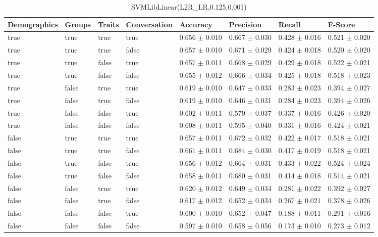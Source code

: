 \clearpage
\begin{table}[h]
	\centering
	\begin{tabular}{|l|l|l|l|l|l|l|l|} %
	\hline
	Demographics & Groups & Traits & Conversation & Accuracy & Precision & Recall & F-Score \\ \hline
	true & true & true & true & 0.656	\( \pm \) 0.010	& 0.667	\( \pm \) 0.030	& 0.428	\( \pm \) 0.016	& 0.521	\( \pm \) 0.020	\\ \hline
	true & true & true & false & 0.657	\( \pm \) 0.010	& 0.671	\( \pm \) 0.029	& 0.424	\( \pm \) 0.018	& 0.520	\( \pm \) 0.020	\\ \hline
	true & true & false & true & 0.657	\( \pm \) 0.011	& 0.668	\( \pm \) 0.029	& 0.429	\( \pm \) 0.018	& 0.522	\( \pm \) 0.021	\\ \hline
	true & true & false & false & 0.655	\( \pm \) 0.012	& 0.666	\( \pm \) 0.034	& 0.425	\( \pm \) 0.018	& 0.518	\( \pm \) 0.023	\\ \hline
	true & false & true & true & 0.619	\( \pm \) 0.010	& 0.647	\( \pm \) 0.033	& 0.283	\( \pm \) 0.023	& 0.394	\( \pm \) 0.027	\\ \hline
	true & false & true & false & 0.619	\( \pm \) 0.010	& 0.646	\( \pm \) 0.031	& 0.284	\( \pm \) 0.023	& 0.394	\( \pm \) 0.026	\\ \hline
	true & false & false & true & 0.602	\( \pm \) 0.011	& 0.579	\( \pm \) 0.037	& 0.337	\( \pm \) 0.016	& 0.426	\( \pm \) 0.020	\\ \hline
	true & false & false & false & 0.608	\( \pm \) 0.011	& 0.595	\( \pm \) 0.040	& 0.331	\( \pm \) 0.016	& 0.424	\( \pm \) 0.021	\\ \hline
	false & true & true & true & 0.657	\( \pm \) 0.011	& 0.672	\( \pm \) 0.032	& 0.422	\( \pm \) 0.017	& 0.518	\( \pm \) 0.021	\\ \hline
	false & true & true & false & 0.661	\( \pm \) 0.011	& 0.684	\( \pm \) 0.030	& 0.417	\( \pm \) 0.019	& 0.518	\( \pm \) 0.021	\\ \hline
	false & true & false & true & 0.656	\( \pm \) 0.012	& 0.664	\( \pm \) 0.031	& 0.433	\( \pm \) 0.022	& 0.524	\( \pm \) 0.024	\\ \hline
	false & true & false & false & 0.658	\( \pm \) 0.011	& 0.680	\( \pm \) 0.031	& 0.414	\( \pm \) 0.018	& 0.514	\( \pm \) 0.021	\\ \hline
	false & false & true & true & 0.620	\( \pm \) 0.012	& 0.649	\( \pm \) 0.034	& 0.281	\( \pm \) 0.022	& 0.392	\( \pm \) 0.027	\\ \hline
	false & false & true & false & 0.617	\( \pm \) 0.012	& 0.652	\( \pm \) 0.034	& 0.267	\( \pm \) 0.021	& 0.378	\( \pm \) 0.026	\\ \hline
	false & false & false & true & 0.600	\( \pm \) 0.010	& 0.652	\( \pm \) 0.047	& 0.188	\( \pm \) 0.011	& 0.291	\( \pm \) 0.016	\\ \hline
	false & false & false & false & 0.597	\( \pm \) 0.010	& 0.658	\( \pm \) 0.056	& 0.173	\( \pm \) 0.010	& 0.273	\( \pm \) 0.012	\\ \hline
	\end{tabular}
	\caption{SVMLibLinear(L2R\_LR,0.125,0.001)}
	\label{tab:revpol}
\end{table}
